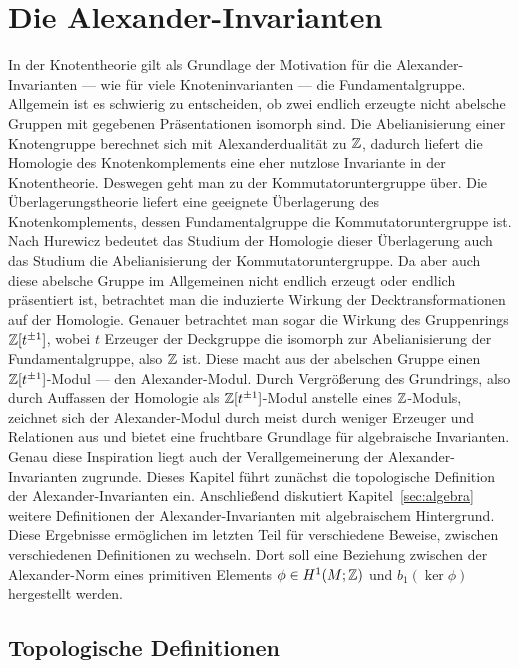 
\section{Die Alexander-Invarianten}

        In der Knotentheorie gilt als Grundlage der Motivation für die Alexander-Invarianten --- wie für viele Knoteninvarianten --- die Fundamentalgruppe. Allgemein ist es schwierig zu entscheiden, ob zwei endlich erzeugte nicht abelsche Gruppen mit gegebenen Präsentationen isomorph sind. Die Abelianisierung einer Knotengruppe berechnet sich mit Alexanderdualität zu $\mathbb{Z}$, dadurch liefert die Homologie des Knotenkomplements eine eher nutzlose Invariante in der Knotentheorie. Deswegen geht man zu der Kommutatoruntergruppe über. Die Überlagerungstheorie liefert eine geeignete Überlagerung des Knotenkomplements, dessen Fundamentalgruppe die Kommutatoruntergruppe ist. Nach Hurewicz bedeutet das Studium der Homologie dieser Überlagerung auch das Studium die Abelianisierung der Kommutatoruntergruppe. Da aber auch diese abelsche Gruppe im Allgemeinen nicht endlich erzeugt oder endlich präsentiert ist, betrachtet man die induzierte Wirkung der Decktransformationen auf der Homologie. Genauer betrachtet man sogar die Wirkung des Gruppenrings $\mathbb{Z} [t^{\pm 1}]$, wobei $t$ Erzeuger der Deckgruppe die isomorph zur Abelianisierung der Fundamentalgruppe, also $\mathbb{Z}$ ist. Diese macht aus der abelschen Gruppe einen $\mathbb{Z} [t^{\pm 1}]$-Modul --- den Alexander-Modul. Durch Vergrößerung des Grundrings, also durch Auffassen der Homologie als $\mathbb{Z}[t^{\pm 1}]$-Modul anstelle eines $\mathbb{Z}$-Moduls, zeichnet sich der Alexander-Modul durch meist durch weniger Erzeuger und Relationen aus und bietet eine fruchtbare Grundlage für algebraische Invarianten. Genau diese Inspiration liegt auch der Verallgemeinerung der Alexander-Invarianten zugrunde.
        Dieses Kapitel führt zunächst die topologische Definition der Alexander-Invarianten ein. Anschließend diskutiert Kapitel~\ref{sec:algebra} weitere Definitionen der Alexander-Invarianten mit algebraischem Hintergrund. Diese Ergebnisse ermöglichen im letzten Teil für verschiedene Beweise, zwischen verschiedenen Definitionen zu wechseln. Dort soll eine Beziehung zwischen der Alexander-Norm eines primitiven Elements $\phi\in H^1(M;\mathbb{Z})$ und $b_1(\ker\phi)$ hergestellt werden.
    

   \subsection{Topologische Definitionen}
       \label{sec:alexdefs}

